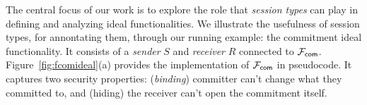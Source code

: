 
The central focus of our work is to explore the role that \emph{session types} can play in defining and analyzing ideal functionalities.
We illustrate the usefulness of session types, for annontating them, through our running example: the commitment ideal functionality.
It consists of a \emph{sender} $S$ and \emph{receiver} $R$ connected to $\mathcal{F}_{{\mathsf {com}}}$.
Figure~\ref{fig:fcomideal}(a) provides the implementation of $\mathcal{F}_{{\mathsf {com}}}$ in pseudocode.
It captures two security properties: (\emph{binding}) committer can't change what they committed to, and (hiding) the receiver can't open the commitment itself. 

